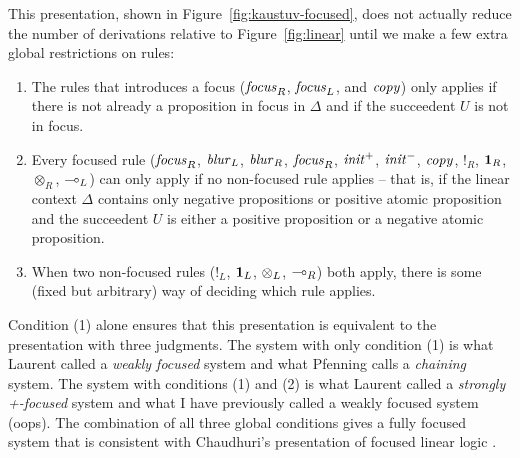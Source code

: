 \newpage


  This presentation, shown in
Figure~\ref{fig:kaustuv-focused}, does not actually reduce the number
of derivations relative to Figure~\ref{fig:linear} until we make a few
extra global restrictions on rules:

\begin{enumerate}
\item The rules that introduces a focus (${\it focus}_R$, ${\it focus}_L$, 
  and ${\it copy}$) only applies if there is not already a proposition 
  in focus in $\Delta$ and if the succeedent $U$ is not in focus. 
\item Every focused rule (${\it focus}_R$, ${\it blur}_L$, ${\it
    blur}_R$, ${\it focus}_R$, ${\it init}^+$, ${\it init}^-$, ${\it
    copy}$, ${!}_R$, ${\mathbf{1}}_R$, ${\otimes}_R$, ${\multimap}_L$) can only
  apply if no non-focused rule applies -- that is, if the
  linear context $\Delta$ contains only negative propositions or positive
  atomic proposition and the succeedent $U$ is either a positive proposition
  or a negative atomic proposition.
\item When two non-focused rules (${!}_L$, ${\mathbf{1}}_L$, ${\otimes}_L$,
  ${\multimap}_R$) both apply, there is some (fixed but arbitrary) way of
  deciding which rule applies.
\end{enumerate}

\noindent
Condition (1) alone ensures that this presentation is equivalent to
the presentation with three judgments. The system with only condition
(1) is what Laurent called a {\it weakly focused} system
\cite{laurent04proof} and what Pfenning calls a {\it chaining} system.
The system with conditions (1) and (2) is what Laurent called a {\it
  strongly +-focused} system and what I have previously called a
weakly focused system (oops). The combination of all three global
conditions gives a fully focused system that is consistent with
Chaudhuri's presentation of focused linear logic
\cite{chaudhuri06focused}.

